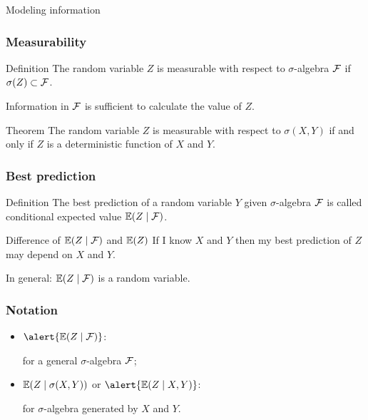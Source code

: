 \begin{frame}{Modeling information}
    


    
\end{frame}



\begin{frame}
    \frametitle{Measurability}

    \pause
    \begin{block}{Definition \formalduck}
        The random variable $Z$ is measurable with respect to $\sigma$-algebra $\mathcal{F}$ if 
        $\sigma(Z) \subset \mathcal{F}$. 
    \end{block}
    \pause
    Information in $\mathcal{F}$ is sufficient to calculate the value of $Z$.
    \pause
    \begin{block}{Theorem \informalduck}
        The random variable $Z$ is measurable with respect to $\sigma(X, Y)$ if and only if
        $Z$ is a deterministic function of $X$ and $Y$.  
    \end{block}
\end{frame}


\begin{frame}
    \frametitle{Best prediction}

    \begin{block}{Definition \informalduck}
        The \alert{best prediction} of a random variable $Y$ given $\sigma$-algebra $\mathcal{F}$ is called 
        \alert{conditional expected value} $\mathbb{E}(Z \mid \mathcal{F})$.
    \end{block}

    \pause 
    \begin{block}{Difference of $\mathbb{E}(Z \mid \mathcal{F})$ and $\mathbb{E}(Z)$}
    If I know $X$ and $Y$ then my best prediction of $Z$ may depend on $X$ and $Y$.

    In general: $\mathbb{E}(Z \mid \mathcal{F})$ is a \alert{random variable}.
    \end{block}
\end{frame}


\begin{frame}
    \frametitle{Notation}

    \begin{itemize}[<+->]
        \item $\alert{\E(Z \mid \cF)}$: 
        
        for a general $\sigma$-algebra $\mathcal{F}$;
        \item $\mathbb{E}(Z \mid \sigma(X, Y))$ or $\alert{\E(Z \mid X, Y)}$: 
        
        for $\sigma$-algebra generated by $X$ and $Y$.
    \end{itemize}
\end{frame}

